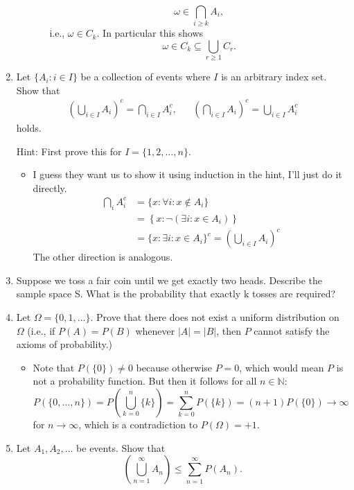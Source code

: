 \documentclass{article}
\begin{document}
\begin{enumerate}
\begin{enumerate}
\begin{itemize}
					$$
					\omega \in \bigcap_{i \geq k} A_i,
					$$
					i.e., $\omega \in C_k$. In particular this shows
					$$
					\omega \in C_k \subseteq \bigcup_{r \geq 1} C_r.
					$$
				\end{itemize}
		\end{enumerate}
	\item Let $\{A_i : i \in I\}$ be a collection of events where $I$ is an arbitrary index set. Show that
	$$
	\begin{aligned}
	\left( \bigcup_{i \in I} A_i \right)^c = \bigcap_{i \in I} A_i^c, && \left( \bigcap_{i \in I} A_i \right)^c = \bigcup_{i \in I} A_i^c
	\end{aligned}
	$$
	holds.

	Hint: First prove this for $I = \{1, 2, \dots, n\}$.
		\begin{itemize}
			\item I guess they want us to show it using induction in the hint, I'll just do it directly.
			$$
			\begin{aligned}
			\bigcap_i A_i^c &= \{x : \forall i : x \notin A_i\} \\
			&= \left\{x : \neg \left( \exists i : x \in A_i \right)\right\} \\
			&= \{x : \exists i : x \in A_i\}^c = \left( \bigcup_{i \in I} A_i \right)^c
			\end{aligned}
			$$
			The other direction is analogous.
		\end{itemize}
	\item Suppose we toss a fair coin until we get exactly two heads. Describe the sample space S. What is the probability that exactly k tosses are required?
	\item Let $\Omega = \{0, 1, \dots \}$. Prove that there does not exist a uniform distribution on $\Omega$ (i.e., if $P(A) = P(B)$ whenever $|A| = |B|$, then $P$ cannot satisfy the axioms of probability.)
		\begin{itemize}
			\item Note that $P(\{0\}) \neq 0$ because otherwise $P = 0$, which would mean $P$ is not a probability function. But then it follows for all $n \in \mathbb{N}$:
			$$
			P(\{0, \dots, n\}) = P\left(\bigcup_{k = 0}^n \{k\} \right) = \sum_{k = 0}^n P(\{k\}) = (n + 1)P(\{0\}) \rightarrow \infty
			$$
			for $n \rightarrow \infty$, which is a contradiction to $P(\Omega) = +1$.
		\end{itemize}
	\item Let $A_1, A_2, \dots$ be events. Show that
	$$
	\left( \bigcup_{n = 1}^\infty A_n \right) \leq \sum_{n = 1}^\infty P(A_n).
$$
\end{enumerate}
\end{document}
